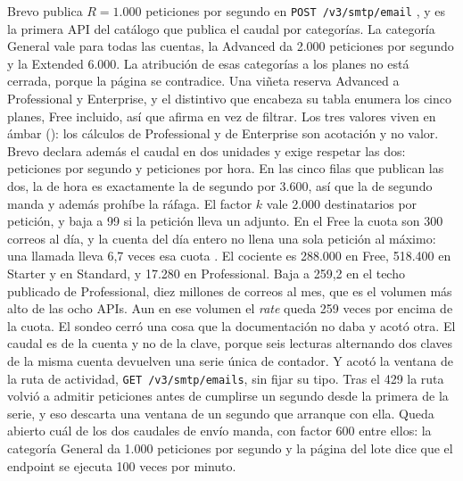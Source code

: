Brevo publica $R = 1.000$ peticiones por segundo en \texttt{POST /v3/smtp/email} \citep{brevodocs}, y es la primera API del catálogo que publica el caudal por categorías.
La categoría General vale para todas las cuentas, la Advanced da 2.000 peticiones por segundo y la Extended 6.000.
La atribución de esas categorías a los planes no está cerrada, porque la página se contradice. Una viñeta reserva Advanced a Professional y Enterprise, y el distintivo que encabeza su tabla enumera los cinco planes, Free incluido, así que afirma en vez de filtrar.
Los tres valores viven en ámbar (\semambar{}): los cálculos de Professional y de Enterprise son acotación y no valor.
Brevo declara además el caudal en dos unidades y exige respetar las dos: peticiones por segundo y peticiones por hora.
En las cinco filas que publican las dos, la de hora es exactamente la de segundo por 3.600, así que la de segundo manda y además prohíbe la ráfaga.
El factor $k$ vale 2.000 destinatarios por petición, y baja a 99 si la petición lleva un adjunto.
En el Free la cuota son 300 correos al día, y la cuenta del día entero no llena una sola petición al máximo: una llamada lleva 6,7 veces esa cuota \citep{brevopricing}.
El cociente es 288.000 en Free, 518.400 en Starter y en Standard, y 17.280 en Professional.
Baja a 259,2 en el techo publicado de Professional, diez millones de correos al mes, que es el volumen más alto de las ocho APIs.
Aun en ese volumen el \textit{rate} queda 259 veces por encima de la cuota.
El sondeo cerró una cosa que la documentación no daba y acotó otra.
El caudal es de la cuenta y no de la clave, porque seis lecturas alternando dos claves de la misma cuenta devuelven una serie única de contador.
Y acotó la ventana de la ruta de actividad, \texttt{GET /v3/smtp/emails}, sin fijar su tipo. Tras el 429 la ruta volvió a admitir peticiones antes de cumplirse un segundo desde la primera de la serie, y eso descarta una ventana de un segundo que arranque con ella.
Queda abierto cuál de los dos caudales de envío manda, con factor 600 entre ellos: la categoría General da 1.000 peticiones por segundo y la página del lote dice que el endpoint se ejecuta 100 veces por minuto.

